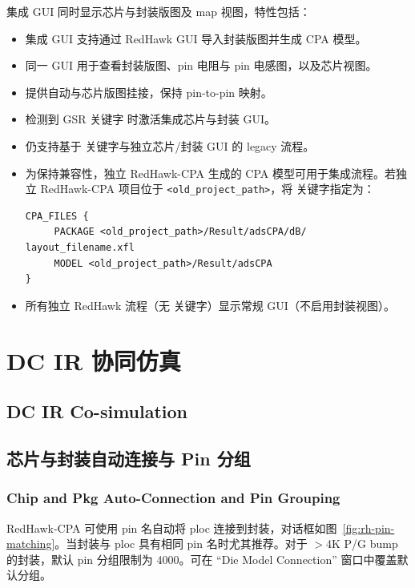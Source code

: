 集成 GUI 同时显示芯片与封装版图及 map 视图，特性包括：
\begin{itemize}
  \item 集成 GUI 支持通过 RedHawk GUI 导入封装版图并生成 CPA 模型。
  \item 同一 GUI 用于查看封装版图、pin 电阻与 pin 电感图，以及芯片视图。
  \item 提供自动与芯片版图挂接，保持 pin-to-pin 映射。
  \item 检测到 GSR 关键字  时激活集成芯片与封装 GUI。
  \item 仍支持基于  关键字与独立芯片/封装 GUI 的 legacy 流程。
  \item 为保持兼容性，独立 RedHawk-CPA 生成的 CPA 模型可用于集成流程。若独立 RedHawk-CPA 项目位于 \texttt{<old\_project\_path>}，将  关键字指定为：
\begin{lstlisting}
CPA_FILES {
     PACKAGE <old_project_path>/Result/adsCPA/dB/
layout_filename.xfl
     MODEL <old_project_path>/Result/adsCPA
}
\end{lstlisting}
  \item 所有独立 RedHawk 流程（无  关键字）显示常规 GUI（不启用封装视图）。
\end{itemize}

\section{DC IR 协同仿真}
\subsection*{DC IR Co-simulation}

\subsection{芯片与封装自动连接与 Pin 分组}
\subsubsection*{Chip and Pkg Auto-Connection and Pin Grouping}

RedHawk-CPA 可使用 pin 名自动将 ploc 连接到封装，对话框如图~\ref{fig:rh-pin-matching}。当封装与 ploc 具有相同 pin 名时尤其推荐。对于 $>$4K P/G bump 的封装，默认 pin 分组限制为 4000。可在 ``Die Model Connection'' 窗口中覆盖默认分组。

\label{fig:rh-pin-matching}

